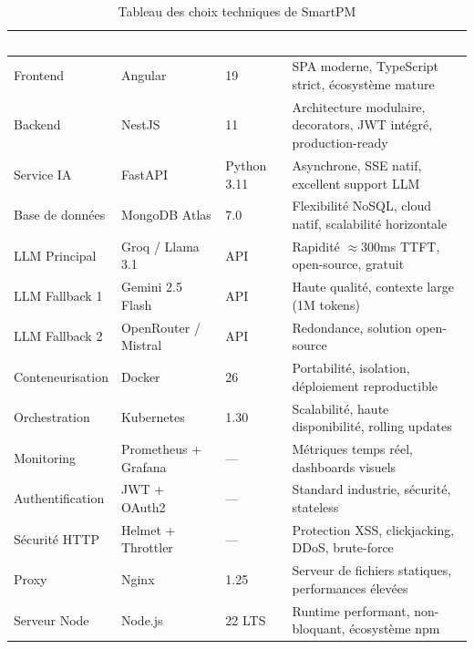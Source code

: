 \begin{table}[H]
  \centering
  \caption{Tableau des choix techniques de SmartPM}
  \label{tab:choix_tech}
  \renewcommand{\arraystretch}{1.5}
  \begin{tabularx}{\textwidth}{|l|l|l|X|}
    \hline
    \rowcolor{tablehead}
    \textcolor{white}{\textbf{Couche}} &
    \textcolor{white}{\textbf{Technologie}} &
    \textcolor{white}{\textbf{Version}} &
    \textcolor{white}{\textbf{Justification}} \\
    \hline
    Frontend & Angular & 19 & SPA moderne, TypeScript strict, écosystème mature \\
    \hline
    Backend & NestJS & 11 & Architecture modulaire, decorators, JWT intégré, production-ready \\
    \hline
    Service IA & FastAPI & Python 3.11 & Asynchrone, SSE natif, excellent support LLM \\
    \hline
    Base de données & MongoDB Atlas & 7.0 & Flexibilité NoSQL, cloud natif, scalabilité horizontale \\
    \hline
    LLM Principal & Groq / Llama 3.1 & API & Rapidité $\approx$300ms TTFT, open-source, gratuit \\
    \hline
    LLM Fallback 1 & Gemini 2.5 Flash & API & Haute qualité, contexte large (1M tokens) \\
    \hline
    LLM Fallback 2 & OpenRouter / Mistral & API & Redondance, solution open-source \\
    \hline
    Conteneurisation & Docker & 26 & Portabilité, isolation, déploiement reproductible \\
    \hline
    Orchestration & Kubernetes & 1.30 & Scalabilité, haute disponibilité, rolling updates \\
    \hline
    Monitoring & Prometheus + Grafana & — & Métriques temps réel, dashboards visuels \\
    \hline
    Authentification & JWT + OAuth2 & — & Standard industrie, sécurité, stateless \\
    \hline
    Sécurité HTTP & Helmet + Throttler & — & Protection XSS, clickjacking, DDoS, brute-force \\
    \hline
    Proxy & Nginx & 1.25 & Serveur de fichiers statiques, performances élevées \\
    \hline
    Serveur Node & Node.js & 22 LTS & Runtime performant, non-bloquant, écosystème npm \\
    \hline
  \end{tabularx}
\end{table}


